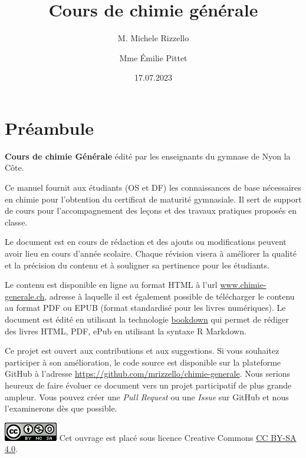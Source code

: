 \documentclass[
  11pt,
  a4paper,
  openany]{book}
\title{Cours de chimie générale}
\author{M. Michele Rizzello \and Mme Émilie Pittet}
\date{17.07.2023}
\begin{document}
\maketitle

{
\setcounter{tocdepth}{1}
\tableofcontents
}
\hypertarget{pruxe9ambule}{%
\chapter*{Préambule}\label{pruxe9ambule}}

\textbf{Cours de chimie Générale} édité par les enseignants du gymnase de Nyon la Côte.

Ce manuel fournit aux étudiants (OS et DF) les connaissances de base nécessaires en chimie pour l'obtention du certificat de maturité gymnasiale. Il sert de support de cours pour l'accompagnement des leçons et des travaux pratiques proposés en classe.

Le document est en cours de rédaction et des ajouts ou modifications peuvent avoir lieu en cours d'année scolaire. Chaque révision visera à améliorer la qualité et la précision du contenu et à souligner sa pertinence pour les étudiants.

Le contenu est disponible en ligne au format HTML à l'url \url{www.chimie-generale.ch}, adresse à laquelle il est également possible de télécharger le contenu au format PDF ou EPUB (format standardisé pour les livres numériques). Le document est édité en utilisant la technologie \href{https://bookdown.org/}{bookdown} qui permet de rédiger des livres HTML, PDF, ePub en utilisant la syntaxe R Markdown.

Ce projet est ouvert aux contributions et aux suggestions. Si vous souhaitez participer à son amélioration, le code source est disponible sur la plateforme GitHub à l'adresse \url{https://github.com/mrizzello/chimie-generale}. Nous serions heureux de faire évoluer ce document vers un projet participatif de plus grande ampleur. Vous pouvez créer une \emph{Pull Request} ou une \emph{Issue} sur GitHub et nous l'examinerons dès que possible.


\includegraphics{images/by-nc-sa.png}
Cet ouvrage est placé sous licence Creative Commons \href{https://creativecommons.org/licenses/by-sa/4.0/deed.fr}{CC BY-SA 4.0}.
\end{document}

